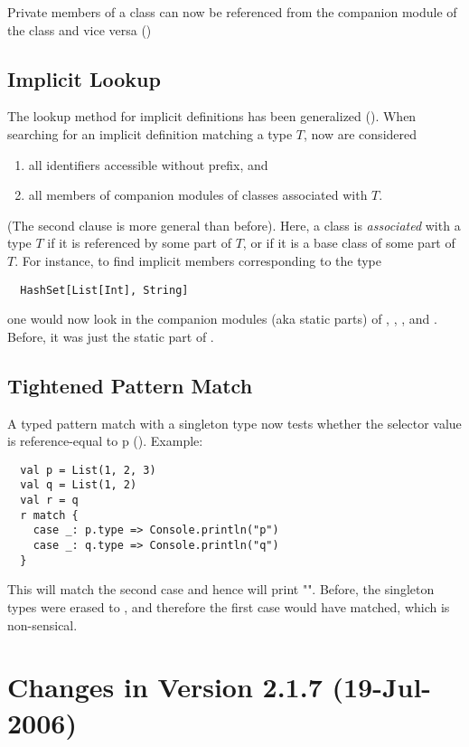 Private members of a class can now be referenced from the companion
module of the class and vice versa ()

\subsection*{Implicit Lookup}

The lookup method for implicit definitions has been generalized
(). 
When searching for an implicit definition matching a type $T$, now are
considered
\begin{enumerate}
\item all identifiers accessible without prefix, and
\item all members of companion modules of classes associated with $T$.
\end{enumerate}
(The second clause is more general than before). 
Here, a class is {\em associated} with a type $T$ if it is referenced
by some part of $T$, 
or if it is a base class of some part of $T$. 
For instance, to find implicit members corresponding to the type
\begin{lstlisting}
  HashSet[List[Int], String]
\end{lstlisting}
one would now look in the companion modules (aka static parts) of 
, , , and . 
Before, it was just the static part of .

\subsection*{Tightened Pattern Match}

A typed pattern match with a singleton type 
now tests whether the selector value is reference-equal to p
(). 
Example:
\begin{lstlisting}
  val p = List(1, 2, 3)
  val q = List(1, 2)
  val r = q
  r match {
    case _: p.type => Console.println("p")
    case _: q.type => Console.println("q")
  }
\end{lstlisting}
This will match the second case and hence will print "". 
Before, the singleton types were erased to , and therefore
the first case 
would have matched, which is non-sensical.

\section*{Changes in Version 2.1.7 (19-Jul-2006)}

